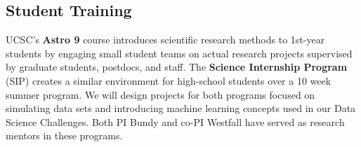 \documentclass[oneside,11pt]{amsart}
\begin{document}
\subsection{Student Training} UCSC's {\bf Astro 9} course introduces scientific research methods to 1st-year students
by engaging small student teams on actual research projects supervised by graduate students,
postdocs, and staff.  The {\bf Science Internship Program} (SIP) creates a similar environment for high-school students
 over a 10 week summer program.  We will design projects for both programs focused on simulating data sets and
 introducing machine learning concepts used in our Data Science Challenges.  Both PI Bundy and co-PI Westfall have
 served as research mentors in these programs.

\newpage

\setcounter{page}{1}


\end{document}
